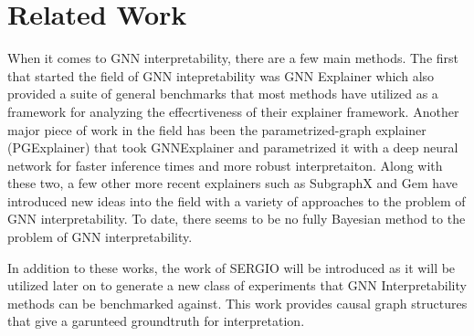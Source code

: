 \section{Related Work}
\label{sec:related}
When it comes to GNN interpretability, there are a few main methods. The first that started the field of GNN intepretability was GNN Explainer \cite{ying_gnnexplainer_2019} which also provided a suite of general benchmarks that most methods have utilized as a framework for analyzing the effecrtiveness of their explainer framework. Another major piece of work in the field has been the parametrized-graph explainer (PGExplainer) \cite{luo_parameterized_2020} that took GNNExplainer and parametrized it with a deep neural network for faster inference times and more robust interpretaiton. Along with these two, a few other more recent explainers such as SubgraphX \cite{yuan_explainability_2021} and Gem \cite{lin_generative_2021} have introduced new ideas into the field with a variety of approaches to the problem of GNN interpretability. To date, there seems to be no fully Bayesian method to the problem of GNN interpretability.

In addition to these works, the work of SERGIO \cite{dibaeinia_sergio_2020} will be introduced as it will be utilized later on to generate a new class of experiments that GNN Interpretability methods can be benchmarked against. This work provides causal graph structures that give a garunteed groundtruth for interpretation.

